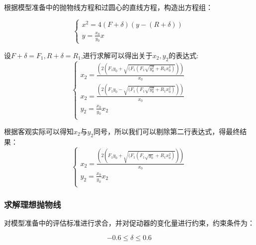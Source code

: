 \documentclass[withoutpreface,bwprint]{cumcmthesis} %
\numberwithin{equation}{subsection}
\begin{document}
根据模型准备中的抛物线方程和过圆心的直线方程，构造出方程组：

\begin{equation}
	\left\{\begin{array}{l}
	x^2=4(F+\delta)(y-(R+\delta))\\
	y=\frac{x_0{}}{y_0{}}x
	\end{array}\right.
\end{equation}


设$F+\delta=F_1{},R+\delta=R_1{}$,进行求解可以得出关于$x_2{},y_2{}$的表达式:
\begin{equation}
	\left\{\begin{array}{l}
		x_2{}=\frac{(2(F_1y_0+\sqrt{(F_1(F_1\sqrt{y_0^{2}}+R_1x_0^{2})}))}{x_0}\\
		x_2{}=\frac{(2(F_1y_0-\sqrt{(F_1(F_1\sqrt{y_0^{2}}+R_1x_0^{2})}))}{x_0}\\
		y_2{}=\frac{x_0{}}{y_0{}}x_{2}\\
	\end{array}\right.
\end{equation}


根据客观实际可以得知$x_2$与$y_2$同号，所以我们可以剔除第二行表达式，得最终结果：
\begin{equation}
	\left\{\begin{array}{l}
		x_2{}=\frac{(2(F_1y_0+\sqrt{(F_1(F_1\sqrt{y_0}+R_1x_0^{2})}))}{x_0}\\
		y_2{}=\frac{x_0{}}{y_0{}}x_{2}\\
	\end{array}\right.
\end{equation}


\subsubsection{求解理想抛物线}


对模型准备中的评估标准进行求合，并对促动器的变化量进行约束，约束条件为：

\begin{equation}
	-0.6\le\delta\le0.6
\end{equation}
\end{document}
